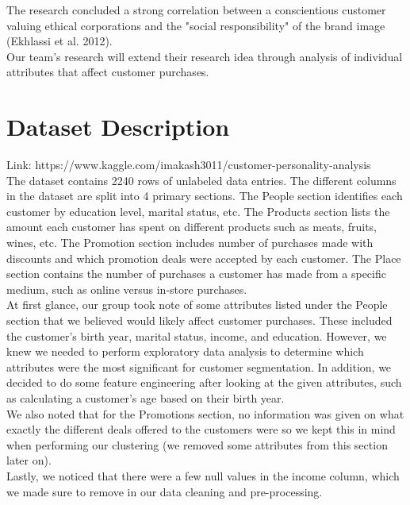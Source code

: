 \documentclass[12pt]{article}
\begin{document}
\noindent The research concluded a strong correlation between a conscientious customer valuing ethical corporations and the "social responsibility" of the brand image (Ekhlassi et al. 2012). \\

\noindent Our team's research will extend their research idea through analysis of individual attributes that affect customer purchases.\\

\section{Dataset Description}

Link: https://www.kaggle.com/imakash3011/customer-personality-analysis\\

\noindent The dataset contains 2240 rows of unlabeled data entries. The different columns in the dataset are split into 4 primary sections. The People section identifies each customer by education level, marital status, etc. The Products section lists the amount each customer has spent on different products such as meats, fruits, wines, etc. The Promotion section includes number of purchases made with discounts and which promotion deals were accepted by each customer. The Place section contains the number of purchases a customer has made from a specific medium, such as online versus in-store purchases.\\

\noindent At first glance, our group took note of some attributes listed under the People section that we believed would likely affect customer purchases. These included the customer's birth year, marital status, income, and education. However, we knew we needed to perform exploratory data analysis to determine which attributes were the most significant for customer segmentation. In addition, we decided to do some feature engineering after looking at the given attributes, such as calculating a customer's age based on their birth year.\\

\noindent We also noted that for the Promotions section, no information was given on what exactly the different deals offered to the customers were so we kept this in mind when performing our clustering (we removed some attributes from this section later on).\\

\noindent Lastly, we noticed that there were a few null values in the income column, which we made sure to remove in our data cleaning and pre-processing.\\
\end{document}
